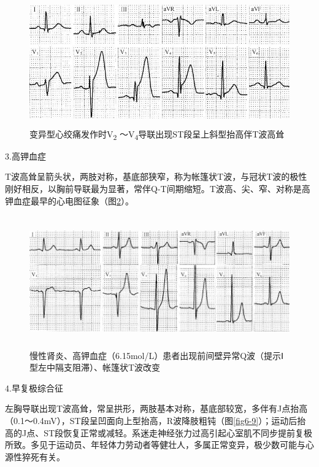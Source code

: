 \begin{figure}[!htbp]
 \centering
 \includegraphics[width=4.94792in,height=2.15625in]{./images/Image00099.jpg}
 \captionsetup{justification=centering}
 \caption{变异型心绞痛发作时V\textsubscript{2} ～V\textsubscript{4}导联出现ST段呈上斜型抬高伴T波高耸}
 \label{fig6-7}
  \end{figure} 


3.高钾血症

T波高耸呈箭头状，两肢对称，基底部狭窄，称为帐篷状T波，与冠状T波的极性刚好相反，以胸前导联最为显著，常伴Q-T间期缩短。T波高、尖、窄、对称是高钾血症最早的心电图征象（图\ref{fig6-8}）。

\begin{figure}[!htbp]
 \centering
 \includegraphics[width=5.78125in,height=2.22917in]{./images/Image00100.jpg}
 \captionsetup{justification=centering}
 \caption{慢性肾炎、高钾血症（6.15mol/L）患者出现前间壁异常Q波（提示Ⅰ型左中隔支阻滞）、帐篷状T波改变}
 \label{fig6-8}
  \end{figure} 

4.早复极综合征

左胸导联出现T波高耸，常呈拱形，两肢基本对称，基底部较宽，多伴有J点抬高（0.1～0.4mV），ST段呈凹面向上型抬高，R波降肢粗钝（图\ref{fig6-9}）；运动后抬高的J点、ST段恢复正常或减轻。系迷走神经张力过高引起心室肌不同步提前复极所致。多见于运动员、年轻体力劳动者等健壮人，多属正常变异，极少数可能与心源性猝死有关。

